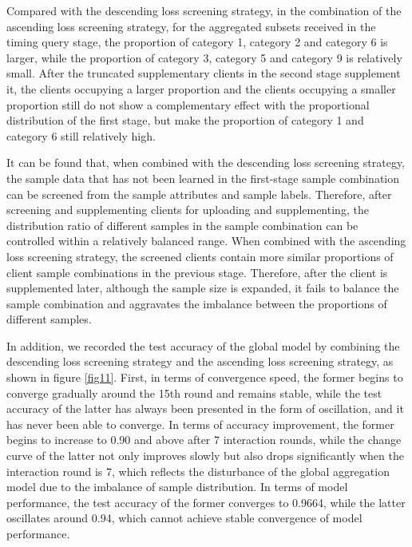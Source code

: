 \documentclass{article}
\begin{document}
Compared with the descending loss screening strategy, in the combination of the ascending loss screening strategy, for the aggregated subsets received in the timing query stage, the proportion of category 1, category 2 and category 6 is larger, while the proportion of category 3, category 5 and category 9 is relatively small. After the truncated supplementary clients in the second stage supplement it, the clients occupying a larger proportion and the clients occupying a smaller proportion still do not show a complementary effect with the proportional distribution of the first stage, but make the proportion of category 1 and category 6 still relatively high. 

It can be found that, when combined with the descending loss screening strategy, the sample data that has not been learned in the first-stage sample combination can be screened from the sample attributes and sample labels. Therefore, after screening and supplementing clients for uploading and supplementing, the distribution ratio of different samples in the sample combination can be controlled within a relatively balanced range. When combined with the ascending loss screening strategy, the screened clients contain more similar proportions of client sample combinations in the previous stage. Therefore, after the client is supplemented later, although the sample size is expanded, it fails to balance the sample combination and aggravates the imbalance between the proportions of different samples.

In addition, we recorded the test accuracy of the global model by combining the descending loss screening strategy and the ascending loss screening strategy, as shown in figure \ref{fig11}. First, in terms of convergence speed, the former begins to converge gradually around the 15th round and remains stable, while the test accuracy of the latter has always been presented in the form of oscillation, and it has never been able to converge. In terms of accuracy improvement, the former begins to increase to 0.90 and above after 7 interaction rounds, while the change curve of the latter not only improves slowly but also drops significantly when the interaction round is 7, which reflects the disturbance of the global aggregation model due to the imbalance of sample distribution. In terms of model performance, the test accuracy of the former converges to 0.9664, while the latter oscillates around 0.94, which cannot achieve stable convergence of model performance.  
\end{document}
